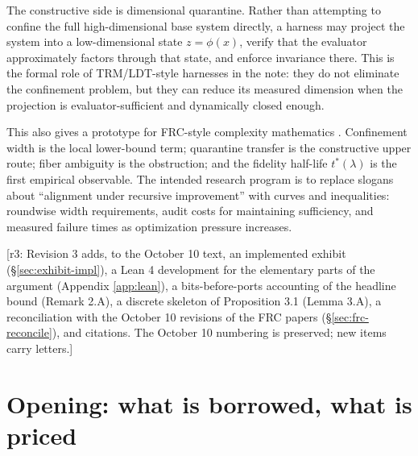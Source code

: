 \documentclass[11pt]{article}
\theoremstyle{definition}
\theoremstyle{remark}
\newcommand{\revnote}[1]{\textcolor{red!60!black}{[r3: #1]}}
\begin{document}
The constructive side is dimensional quarantine. Rather than attempting to confine the full high-dimensional base system directly, a harness may project the system into a low-dimensional state $z=\phi(x)$, verify that the evaluator approximately factors through that state, and enforce invariance there. This is the formal role of TRM/LDT-style harnesses in the note: they do not eliminate the confinement problem, but they can reduce its measured dimension when the projection is evaluator-sufficient and dynamically closed enough.

This also gives a prototype for FRC-style complexity mathematics \cite{dugan2025frc,dugan2025collapse}. Confinement width is the local lower-bound term; quarantine transfer is the constructive upper route; fiber ambiguity is the obstruction; and the fidelity half-life $t^*(\lambda)$ is the first empirical observable. The intended research program is to replace slogans about ``alignment under recursive improvement'' with curves and inequalities: roundwise width requirements, audit costs for maintaining sufficiency, and measured failure times as optimization pressure increases.

\revnote{Revision 3 adds, to the October 10 text, an implemented exhibit (\S\ref{sec:exhibit-impl}), a Lean 4 development for the elementary parts of the argument (Appendix \ref{app:lean}), a bits-before-ports accounting of the headline bound (Remark 2.A), a discrete skeleton of Proposition 3.1 (Lemma 3.A), a reconciliation with the October 10 revisions of the FRC papers (\S\ref{sec:frc-reconcile}), and citations. The October 10 numbering is preserved; new items carry letters.}

\section{Opening: what is borrowed, what is priced}
\end{document}
